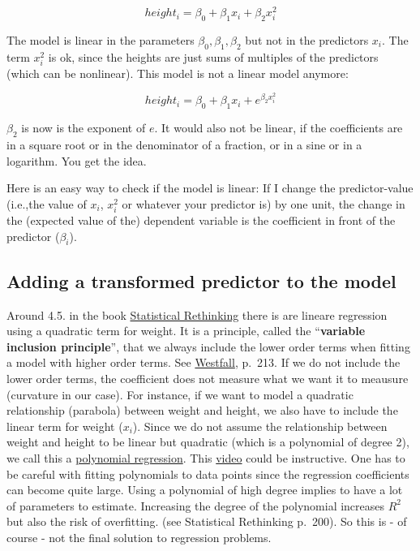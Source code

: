 \documentclass[
]{book}
\begin{document}
\[height_i = \beta_0 + \beta_1 x_i + \beta_2 x_i^2\]

The model is linear in the parameters \(\beta_0, \beta_1, \beta_2\) but not in the predictors \(x_i\).
The term \(x_i^2\) is ok, since the heights are just sums of multiples of the predictors (which can be nonlinear).
This model is not a linear model anymore:

\[height_i = \beta_0 + \beta_1 x_i + e^{\beta_2 x_i^2}\]

\(\beta_2\) is now is the exponent of \(e\). It would also not be linear,
if the coefficients are in a square root or in the denominator of a fraction,
or in a sine or in a logarithm. You get the idea.

Here is an easy way to check if the model is linear: If I change the predictor-value
(i.e.,the value of \(x_i\), \(x_i^2\) or whatever your predictor is) by one unit,
the change in the (expected value of the) dependent variable is the coefficient in front of
the predictor (\(\beta_i\)).

\subsection{Adding a transformed predictor to the model}\label{adding_transformed_predictor_bayes}

Around 4.5. in the book \href{https://civil.colorado.edu/~balajir/CVEN6833/bayes-resources/RM-StatRethink-Bayes.pdf}{Statistical Rethinking}
there is are lineare regression using a quadratic term for weight.
It is a principle, called the ``\textbf{variable inclusion principle}'', that we always include the lower order terms when fitting a model
with higher order terms. See \href{https://vdoc.pub/documents/understanding-regression-analysis-a-conditional-distribution-approach-84oqjr8sqva0}{Westfall},
p.~213. If we do not include the lower order terms, the coefficient does not measure what
we want it to meausure (curvature in our case). For instance, if we want to model a quadratic relationship (parabola) between
weight and height, we also have to include the linear term for weight (\(x_i\)).
Since we do not assume the relationship between weight and height to be linear but
quadratic (which is a polynomial of degree 2), we call this a
\href{https://en.wikipedia.org/wiki/Polynomial_regression\#:~:text=In\%20statistics\%2C\%20polynomial\%20regression\%20is,nth\%20degree\%20polynomial\%20in\%20x.}{polynomial regression}.
This \href{https://www.youtube.com/watch?v=QptI-vDle8Y&ab_channel=MikeXCohen}{video} could be instructive.
One has to be careful with fitting polynomials to data points since the regression coefficients
can become quite large. Using a polynomial of high degree implies to have a lot of parameters
to estimate. Increasing the degree of the polynomial increases \(R^2\) but also the risk of overfitting.
(see Statistical Rethinking p.~200). So this is - of course - not the final solution to regression problems.
\end{document}
